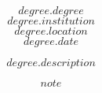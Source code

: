 


\begin{cventries}
 \cventry
    {$$degree.degree$$} %
    {$$degree.institution$$}%
    {$$degree.location$$} %
    {$$degree.date$$} %
    {
        $$degree.description$$
      \begin{cvitems} %
        \item{$$note$$}
      \end{cvitems}
    }
\end{cventries}



